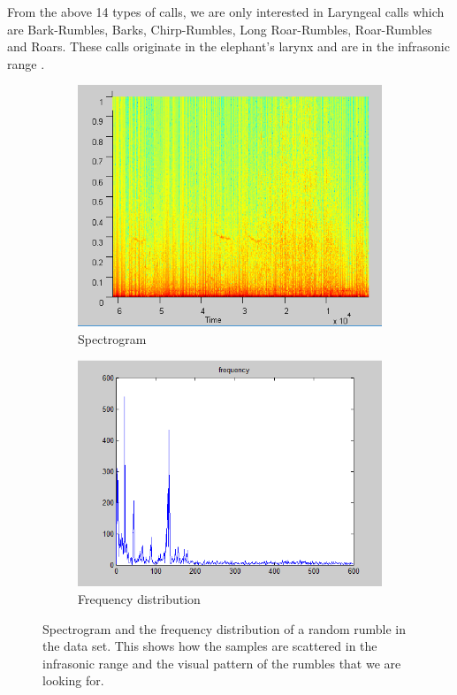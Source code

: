 \documentclass[12pt]{article}
\numberwithin{figure}{section}
\numberwithin{table}{section}
\begin{document}
From the above 14 types of calls, we are only interested in Laryngeal calls which are Bark-Rumbles, Barks, Chirp-Rumbles, Long Roar-Rumbles, Roar-Rumbles and Roars. These calls originate in the elephant's larynx and are in the infrasonic range \cite{42}.

\begin{figure}[H]
\centering
\begin{subfigure}{.5\textwidth}
  \centering
  \includegraphics[width=.8\linewidth]{rumble_spectro.png}
  \caption{Spectrogram}
  \label{rumble_spectro}
\end{subfigure}%
\begin{subfigure}{.5\textwidth}
  \centering
  \includegraphics[width=.8\linewidth]{rumble_sfft.png}
  \caption{Frequency distribution}
  \label{fig:sub2}
\end{subfigure}
\caption[Spectrogram and the frequency distribution of a random rumble in the data set.]{Spectrogram and the frequency distribution of a random rumble in the data set. This shows how the samples are scattered in the infrasonic range and the visual pattern of the rumbles that we are looking for.}
\label{spectro:fft}
\end{figure} 
\end{document}
